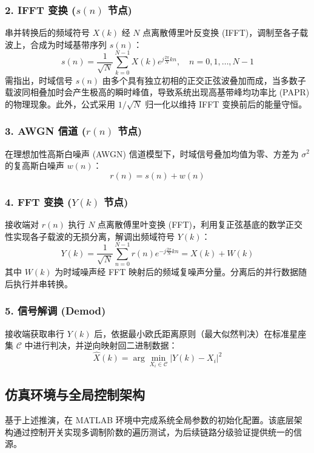 \documentclass[a4paper, 11pt]{ctexart}
\begin{document}
\subsubsection{2. IFFT 变换 ($s(n)$ 节点)}
串并转换后的频域符号 $X(k)$ 经 $N$ 点离散傅里叶反变换 (IFFT)，调制至各子载波上，合成为时域基带序列 $s(n)$：
\begin{equation}
    s(n) = \frac{1}{\sqrt{N}} \sum_{k=0}^{N-1} X(k) e^{j \frac{2\pi}{N} kn}, \quad n = 0, 1, \dots, N-1
\end{equation}
需指出，时域信号 $s(n)$ 由多个具有独立初相的正交正弦波叠加而成，当多数子载波同相叠加时会产生极高的瞬时峰值，导致系统出现高基带峰均功率比 (PAPR) 的物理现象。此外，公式采用 $1/\sqrt{N}$ 归一化以维持 IFFT 变换前后的能量守恒。

\subsubsection{3. AWGN 信道 ($r(n)$ 节点)}
在理想加性高斯白噪声 (AWGN) 信道模型下，时域信号叠加均值为零、方差为 $\sigma^2$ 的复高斯白噪声 $w(n)$：
\begin{equation}
    r(n) = s(n) + w(n)
\end{equation}

\subsubsection{4. FFT 变换 ($Y(k)$ 节点)}
接收端对 $r(n)$ 执行 $N$ 点离散傅里叶变换 (FFT)，利用复正弦基底的数学正交性实现各子载波的无损分离，解调出频域符号 $Y(k)$：
\begin{equation}
    Y(k) = \frac{1}{\sqrt{N}} \sum_{n=0}^{N-1} r(n) e^{-j \frac{2\pi}{N} kn} = X(k) + W(k)
\end{equation}
其中 $W(k)$ 为时域噪声经 FFT 映射后的频域复噪声分量。分离后的并行数据随后执行并串转换。

\subsubsection{5. 信号解调 (Demod)}
接收端获取串行 $Y(k)$ 后，依据最小欧氏距离原则（最大似然判决）在标准星座集 $\mathcal{C}$ 中进行判决，并逆向映射回二进制数据：
\begin{equation}
    \hat{X}(k) = \arg \min_{X_i \in \mathcal{C}} |Y(k) - X_i|^2
\end{equation}

\subsection{仿真环境与全局控制架构}
基于上述推演，在 MATLAB 环境中完成系统全局参数的初始化配置。该底层架构通过控制开关实现多调制阶数的遍历测试，为后续链路分级验证提供统一的信源。
\end{document}
